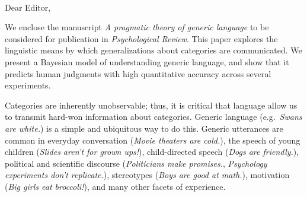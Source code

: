 \documentclass[11pt,letterpaper]{letter} %
\def\opening#1{\thispagestyle{empty}
{\centering\fromaddress \vspace{0.6in} \\ %
\hspace*{\longindentation}\hspace*{\fill}\par} %
\vspace{0.4in} %
\noindent #1 %
}
\begin{document}

\begin{letter}






\opening{Dear Editor,}


We enclose the manuscript \emph{A pragmatic theory of generic language} to be considered for publication in \emph{Psychological Review}. 
This paper explores the linguistic means by which generalizations about categories are communicated.  
We present a Bayesian model of understanding generic language, and show that it predicts human judgments with high quantitative accuracy across several experiments.


Categories are inherently unobservable; thus, it is critical that language allow us to transmit hard-won information about categories. Generic language (e.g.~\emph{Swans are white.}) is a simple and ubiquitous way to do this. 
Generic utterances are common in everyday conversation (\emph{Movie theaters are cold.}), the speech of young children (\emph{Slides aren't for grown ups!}), child-directed speech (\emph{Dogs are friendly.}), political and scientific discourse (\emph{Politicians make promises.}, \emph{Psychology experiments don't replicate.}), stereotypes (\emph{Boys are good at math.}), motivation (\emph{Big girls eat broccoli!}), and many other facets of experience.


\end{letter}
\end{document}
